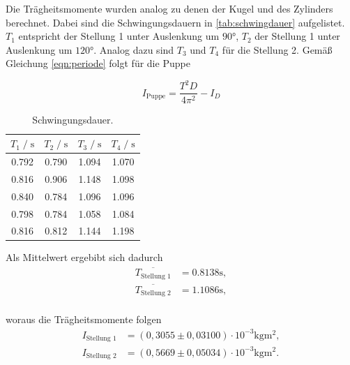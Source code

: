 Die Trägheitsmomente wurden analog zu denen der Kugel und des Zylinders berechnet. Dabei sind die Schwingungsdauern in \autoref{tab:schwingdauer}
aufgelistet.
$T_1$ entspricht der Stellung 1 unter Auslenkung um $90°$, $T_2$ der Stellung 1 unter Auslenkung um $120°$.
Analog dazu sind $T_3$ und $T_4$ für die Stellung 2. Gemäß Gleichung \autoref{eqn:periode} folgt für die Puppe


\begin{equation*}
  I_{\text{Puppe}} = \frac{T^2D}{4\pi^2} - I_D
\end{equation*}

\begin{table}[H]
    \centering
        \caption{Schwingungsdauer.}
        \label{tab:schwingdauer}
        \begin{tabular}{c c c c}
        \toprule
        $T_1 \;/\; \si{\second}$ & $T_2 \;/\; \si{\second}$ & $T_3 \;/\; \si{\second}$ & $T_4 \;/\; \si{\second}$ \\
        \midrule
        0.792 & 0.790 & 1.094 & 1.070 \\
        0.816 & 0.906 & 1.148 & 1.098 \\
        0.840 & 0.784 & 1.096 & 1.096 \\
        0.798 & 0.784 & 1.058 & 1.084 \\
        0.816 & 0.812 & 1.144 & 1.198 \\
        \bottomrule
    \end{tabular}
\end{table}


Als Mittelwert ergebibt sich dadurch
\begin{align*}
  \overline{T_{\text{Stellung 1}}} &= 0.8138 \si{\second}, \\
  \overline{T_{\text{Stellung 2}}} &= 1.1086 \si{\second}, \\
\end{align*}


woraus die Trägheitsmomente folgen %
\begin{align*}
  I_{\text{Stellung 1}} &= (0,3055\pm 0,03100) \cdot 10^{-3} \si{\kilogram\meter^2}, \\
  I_{\text{Stellung 2}} &= (0,5669\pm 0,05034) \cdot 10^{-3} \si{\kilogram\meter^2}. \\
\end{align*}


